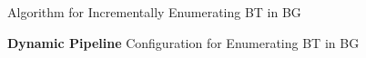 


\begin{frame}[fragile]{Algorithm for Incrementally Enumerating BT in BG}
  \begin{center}
    \textbf{Dynamic Pipeline} Configuration for Enumerating BT in BG
  \end{center}    
  \begin{figure}
    \centering  
  \end{figure}
  \begin{figure}
    \centering  
  \end{figure}
\end{frame}

